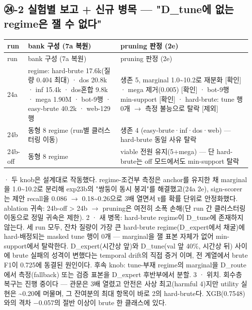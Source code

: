 \subsection*{㉔-2 실험별 보고 +\allowbreak{} 신규 병목 — "D\_\allowbreak{}tune에 없는 regime은 잴 수 없다"}
\begingroup
\footnotesize
\begin{longtable}{>{\raggedright\arraybackslash}p{}>{\raggedright\arraybackslash}p{}>{\raggedright\arraybackslash}p{}}
\toprule
run & bank 구성 (7a 복원) & pruning 판정 (2e) \\ \midrule
\endfirsthead
run & bank 구성 (7a 복원) & pruning 판정 (2e) \\ \midrule
\endhead
{}24a & 8 regime: hard-brute 17.6k(질량 0.404 최대) · dos 20.8k · inf 15.4k · dos혼합 9.8k · mega 1.90M · bot-9행 · easy-brute 40.2k · web-129행 & 생존 5, marginal 1.0\textasciitilde{}10.2로 재분화 [확인] · mega 제거(0.005) [확인] · bot-9행 min-support [확인] · hard-brute: tune 행 0개  \ensuremath{\rightarrow}  측정 불능으로 탈락 [제외] \\
{}24b & 동형 8 regime (run별 클러스터링 이동) & 생존 4 (easy-brute·inf·dos·web) — hard-brute 동일 사유 탈락 \\
{}24b-off & 동형 8 regime & viable 전원 유지(5+\allowbreak{}mega) — 단 hard-brute는 off 모드에서도 min-support 탈락 \\
\bottomrule
\end{longtable}
 · 두 knob은 설계대로 작동했다. regime-조건부 측정은 anchor를 유지한 채 marginal을 1.0\textasciitilde{}10.2로 분리해 exp23b의 "쌍둥이 동시 붕괴"를 해결했고(24a 2e), sign-scorer는 제안 recall을 0.086 \ensuremath{\rightarrow} 0.18\textasciitilde{}0.26으로 3배 열면서 τ를 확률 단위로 안정화했다. ablation 귀속: 24b-off > 24b  \ensuremath{\rightarrow}  pruning은 여전히 소폭 손해(단 run 간 클러스터링 이동으로 정밀 귀속은 제한). 2 · 새 병목: hard-brute regime이 D\_\allowbreak{}tune에 존재하지 않는다. 세 run 모두, 잔차 질량이 가장 큰 hard-brute regime(D\_\allowbreak{}expert에서 채굴)에 hard-배정되는 masked tune 행이 0개 — marginal을 잴 표본 자체가 없어 min-support에서 탈락한다. D\_\allowbreak{}expert(시간상 앞)와 D\_\allowbreak{}tune(val 앞 40\%, 시간상 뒤) 사이에 brute 실패의 성격이 변했다는 temporal drift의 직접 증거 이며, 전 계열에서 brute F1이 0.725에 동결된 원인이다. 후속 knob: tune-부재 regime의 marginal을 D\_\allowbreak{}route에서 측정(fallback) 또는 검증 표본을 D\_\allowbreak{}expert 후반부에서 분할. 3 · 위치. 회수층 복구는 진행 중이다 — 관문은 3배 열렸고 안전은 사상 최고(harmful 4)지만 utility 실현은 \textasciitilde{}0.20에 머물며, 그 잔여분의 최대 항목이 바로 2의 hard-brute다. XGB(0.7548)와의 격차 −0.057의 절반 이상이 brute 한 클래스에 있다.


